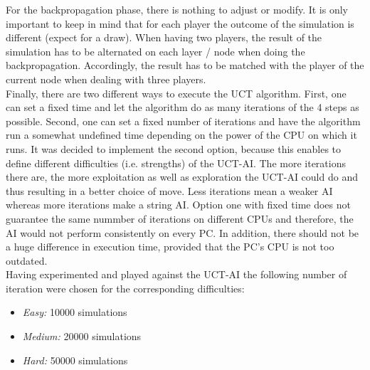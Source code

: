 \documentclass[english]{report}
\begin{document}
For the backpropagation phase, there is nothing to adjust or modify. It is only
important to keep in mind that for each player the outcome of the simulation is
different (expect for a draw). When having two players, the result of the
simulation has to be alternated on each layer / node when doing the
backpropagation. Accordingly, the result has to be matched with the player of
the current node when dealing with three players.\\

Finally, there are two different ways to execute the UCT algorithm. First, one
can set a fixed time and let the algorithm do as many iterations of the 4 steps
as possible. Second, one can set a fixed number of iterations and have the
algorithm run a somewhat undefined time depending on the power of the CPU on
which it runs. It was decided to implement the second option, because this
enables to define different difficulties (i.e. strengths) of the UCT-AI.
The more iterations there are, the more exploitation as well as exploration the
UCT-AI could do and thus resulting in a better choice of move. Less iterations
mean a weaker AI whereas more iterations make a string AI. Option one with fixed
time does not guarantee the same nummber of iterations on different CPUs and
therefore, the AI would not perform consistently on every PC. In addition, there
should not be a huge difference in execution time, provided that the PC's CPU is
not too outdated. \\

Having experimented and played against the UCT-AI the following number of
iteration were chosen for the corresponding difficulties:
\begin{itemize}
	\item \textit{Easy:} 10000 simulations
	\item \textit{Medium:}  20000 simulations
	\item \textit{Hard:}  50000 simulations
\end{itemize}


\end{document}
